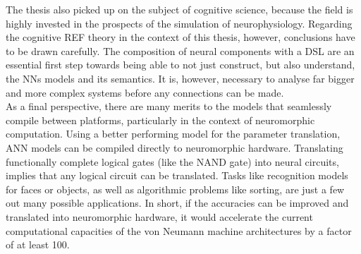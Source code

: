 \documentclass[report.tex]{subfiles}
\begin{document}
The thesis also picked up on the subject of cognitive science, because the field
is highly invested in the prospects of the simulation of neurophysiology.
Regarding the cognitive REF theory in the context of this thesis, however,
conclusions have to be drawn carefully.
The composition of neural components with a \gls{DSL} are an essential first
step towards being able to not just construct, but also understand, the 
\glspl{NN} models and its semantics.
It is, however, necessary to analyse far bigger and more complex systems before
any connections can be made.
\\[0.1cm]

As a final perspective, there are many merits to the models that seamlessly
compile between platforms, particularly in the context of neuromorphic
computation.
Using a better performing model for the parameter translation, \gls{ANN} models can
be compiled directly to neuromorphic hardware.
Translating functionally complete logical gates (like the NAND gate) into neural
circuits, implies that any logical circuit can be translated.
Tasks like recognition models for faces or objects, as well as algorithmic
problems like sorting, are just a few out many possible applications.
In short, if the accuracies can be improved and translated into neuromorphic hardware, it
would accelerate the current computational capacities of the von Neumann machine
architectures by a factor of at least 100.
\\[0.1cm]

\FloatBarrier
\end{document}
